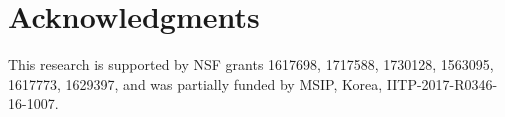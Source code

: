 \section{Acknowledgments}
This research is supported by NSF grants 1617698, 1717588, 1730128, 1563095, 1617773, 1629397, and was partially funded by MSIP, Korea, IITP-2017-R0346-16-1007.